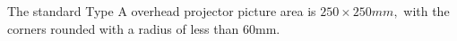 The standard Type A overhead projector picture area is \ensuremath{250 \times 250mm,}
with the corners rounded with a radius of less than 60mm.